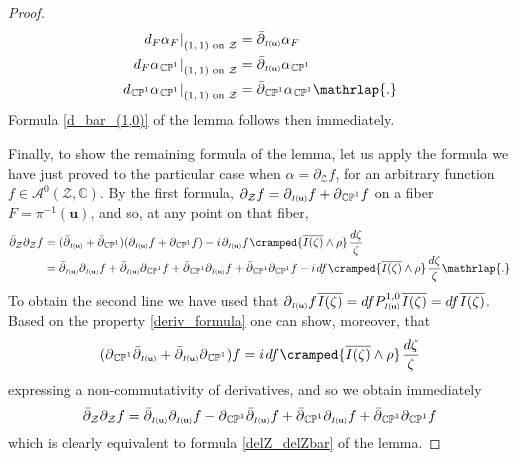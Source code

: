 \documentclass[11pt]{amsart}
\theoremstyle{remark}
\theoremstyle{remark}
\theoremstyle{definition}
\theoremstyle{definition}
\theoremstyle{definition}
\newcommand{\Iu}{\scriptscriptstyle{I\nhp(\nhp\mathbf{u}\hspace{-0.25pt})}} %
\newcommand{\0}{{\scriptstyle 0'}} %
\newcommand{\1}{{\scriptstyle 1'}}
\newcommand{\pt}{\hspace{1pt}} %
\newcommand{\hp}{\hspace{0.5pt}} %
\newcommand{\nhp}{\hspace{-0.5pt}} %
\begin{document}
\begin{proof}
{\allowdisplaybreaks
\begin{equation}
\begin{aligned}
d_F\alpha_F \hp |^{\phantom{+}}_{\text{$(1,1)$ on $\mathcal{Z}$}} & = \bar{\partial}_{\Iu} \alpha_F \\
d_F\alpha_{\hp\smash{\mathbb{CP}^1}} \hp |^{\phantom{+}}_{\text{$(1,1)$ on $\mathcal{Z}$}} & = \bar{\partial}_{\Iu} \alpha_{\hp\smash{\mathbb{CP}^1}} \\
d_{\hp\smash{\mathbb{CP}^1}}\alpha_{\hp\smash{\mathbb{CP}^1}} \hp |^{\phantom{+}}_{\text{$(1,1)$ on $\mathcal{Z}$}} & = \bar{\partial}_{\hp\smash{\mathbb{CP}^1}} \alpha_{\hp\smash{\mathbb{CP}^1}} \mathrlap{.}
\end{aligned}
\end{equation}
}%
Formula \eqref{d_bar_(1,0)} of the lemma follows then immediately. 

Finally, to show the remaining formula of the lemma, let us apply the formula we have just proved to the particular case when $\alpha = \partial_{\mathcal{Z}}f$, for an arbitrary function $f \in \mathscr{A}^0(\mathcal{Z},\mathbb{C})$. By the first formula, $\partial_{\mathcal{Z}}f = \partial_{\Iu}f + \partial_{\hp\smash{\mathbb{CP}^1}}f$ on a fiber $F=\pi^{-1}(\mathbf{u})$, and so, at any point on that fiber, 
{\allowdisplaybreaks
\begin{align}
\bar{\partial}_{\mathcal{Z}} \partial_{\mathcal{Z}} f & = (\bar{\partial}_{\Iu} + \bar{\partial}_{\hp\smash{\mathbb{CP}^1}})(\partial_{\Iu} f + \partial_{\hp\smash{\mathbb{CP}^1}} f) - i\pt \partial_{\Iu} f \hp \cramped{\overline{I(\zeta)} \wedge \rho} \pt \frac{d\zeta}{\zeta} \nonumber \\[-4pt]
& = \bar{\partial}_{\Iu}\partial_{\Iu} f + \bar{\partial}_{\Iu}\partial_{\hp\smash{\mathbb{CP}^1}} f + \bar{\partial}_{\hp\smash{\mathbb{CP}^1}}\partial_{\Iu} f + \bar{\partial}_{\hp\smash{\mathbb{CP}^1}}\partial_{\hp\smash{\mathbb{CP}^1}} f - i\pt d f \hp \cramped{\overline{I(\zeta)} \wedge \rho} \pt \frac{d\zeta}{\zeta} \mathrlap{.} \nonumber
\end{align}
}%
To obtain the second line we have used that $\partial_{\Iu} f \hp \overline{I(\zeta)} = df P^{1,0}_{\Iu} \hp \overline{I(\zeta)} = df \hp \overline{I(\zeta)}$. Based on the property \eqref{deriv_formula} one can show, moreover, that
\begin{equation} \label{deriv_commutator}
(\partial_{\hp\smash{\mathbb{CP}^1}}\bar{\partial}_{\Iu} + \bar{\partial}_{\Iu}\partial_{\hp\smash{\mathbb{CP}^1}}) f = i\pt d f \hp \cramped{\overline{I(\zeta)} \wedge \rho} \pt \frac{d\zeta}{\zeta}
\end{equation}
expressing a non-commutativity of derivatives, and so we obtain immediately
\begin{equation}
\bar{\partial}_{\mathcal{Z}} \partial_{\mathcal{Z}} f = \bar{\partial}_{\Iu}\partial_{\Iu} f - \partial_{\hp\smash{\mathbb{CP}^1}}\bar{\partial}_{\Iu} f + \bar{\partial}_{\hp\smash{\mathbb{CP}^1}}\partial_{\Iu} f + \bar{\partial}_{\hp\smash{\mathbb{CP}^1}}\partial_{\hp\smash{\mathbb{CP}^1}} f
\end{equation}
which is clearly equivalent to formula \eqref{delZ_delZbar} of the lemma. 
\end{proof}
\end{document}
